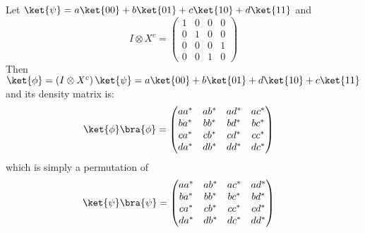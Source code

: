 \begingroup
%
\par Let $\ket{\psi} = a \ket{00} + b \ket{01} + c \ket{10} + d \ket{11}$ and
$$
I \otimes X^c = \begin{pmatrix} 1 & 0 & 0 & 0 \\ 0 & 1 & 0 & 0 \\ 0 & 0 & 0 & 1 \\ 0 & 0 & 1 & 0 \end{pmatrix}
$$
%
Then $\ket{\phi} = \left( I \otimes X^c \right) \ket{\psi} = a \ket{00} + b \ket{01} + d \ket{10} + c \ket{11}$ and its density matrix is:
%
\begin{align}
\ket{\phi} \bra{\phi} &= \begin{pmatrix} aa^* & ab^* & ad^* & ac^* \\ ba^* & bb^* & bd^* & bc^* \\ ca^* & cb^* & cd^* & cc^* \\ da^* & db^* & dd^* & dc^* \end{pmatrix}
\end{align}
%
which is simply a permutation of
\begin{align}
\ket{\psi} \bra{\psi} &= \begin{pmatrix} aa^* & ab^* & ac^* & ad^* \\ ba^* & bb^* & bc^* & bd^* \\ ca^* & cb^* & cc^* & cd^* \\ da^* & db^* & dc^* & dd^* \end{pmatrix}
\end{align}
%
\endgroup
